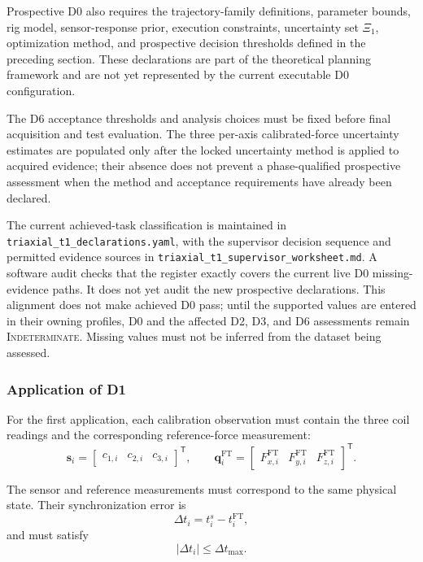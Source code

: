 \documentclass[11pt,a4paper]{article}
\begin{document}
Prospective D0 also requires the trajectory-family definitions, parameter
bounds, rig model, sensor-response prior, execution constraints, uncertainty
set $\Xi_1$, optimization method, and prospective decision thresholds defined
in the preceding section. These declarations are part of the theoretical
planning framework and are not yet represented by the current executable D0
configuration.

The D6 acceptance thresholds and analysis choices must be fixed before final
acquisition and test evaluation. The three per-axis calibrated-force
uncertainty estimates are populated only after the locked uncertainty method
is applied to acquired evidence; their absence does not prevent a
phase-qualified prospective assessment when the method and acceptance
requirements have already been declared.

The current achieved-task classification is maintained in
\texttt{triaxial\_t1\_declarations.yaml}, with the supervisor decision sequence
and permitted evidence sources in
\texttt{triaxial\_t1\_supervisor\_worksheet.md}. A software audit checks that
the register exactly covers the current live D0 missing-evidence paths. It
does not yet audit the new prospective declarations. This alignment does not
make achieved D0 pass; until the supported values are entered in their owning
profiles, D0 and the affected D2, D3, and D6 assessments remain
\textsc{Indeterminate}. Missing values must not be inferred from the dataset
being assessed.

\subsubsection{Application of D1}

For the first application, each calibration observation must contain the three
coil readings and the corresponding reference-force measurement:
\begin{equation}
    \mathbf{s}_i
    =
    \begin{bmatrix}
        c_{1,i} & c_{2,i} & c_{3,i}
    \end{bmatrix}^{\mathsf{T}},
    \qquad
    \mathbf{q}_i^{\mathrm{FT}}
    =
    \begin{bmatrix}
        F_{x,i}^{\mathrm{FT}} &
        F_{y,i}^{\mathrm{FT}} &
        F_{z,i}^{\mathrm{FT}}
    \end{bmatrix}^{\mathsf{T}}.
\end{equation}

The sensor and reference measurements must correspond to the same physical
state. Their synchronization error is
\begin{equation}
    \Delta t_i
    =
    t_i^{s}-t_i^{\mathrm{FT}},
\end{equation}
and must satisfy
\begin{equation}
    \lvert\Delta t_i\rvert\leq\Delta t_{\max}.
\end{equation}
\end{document}
